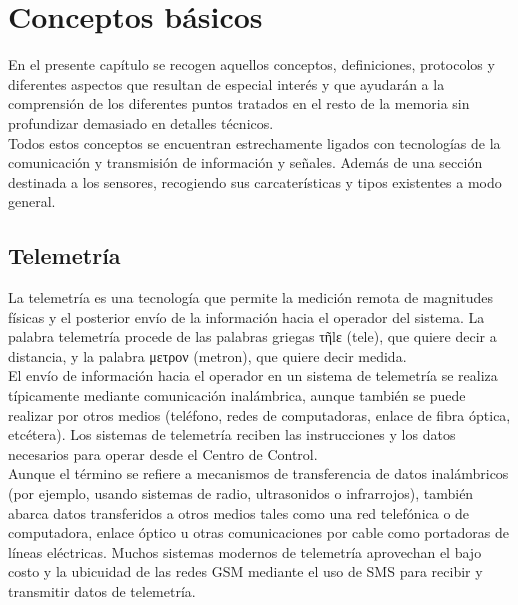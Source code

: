 
\newpage

\chapter{Conceptos básicos}
\label{chap:conceptos-básicos}


En el presente capítulo se recogen aquellos conceptos, definiciones, protocolos y diferentes aspectos que resultan de especial interés y que ayudarán a la comprensión de los diferentes puntos tratados en el resto de 
la memoria sin profundizar demasiado en detalles técnicos.\\

Todos estos conceptos se encuentran estrechamente ligados con tecnologías de la comunicación y transmisión de información y señales. Además de una sección destinada a los sensores, recogiendo sus 
carcaterísticas y tipos existentes a modo general.\\


\section{Telemetría}
\label{def:telemetria}

La telemetría es una tecnología que permite la medición remota de magnitudes físicas y el posterior envío de la información hacia el operador del sistema. La palabra telemetría
procede de las palabras griegas τῆlε (tele), que quiere decir a distancia, y la palabra μετρον (metron), que quiere decir medida.\\

El envío de información hacia el operador en un sistema de telemetría se realiza típicamente mediante comunicación inalámbrica, aunque también se puede realizar por otros medios 
(teléfono, redes de computadoras, enlace de fibra óptica, etcétera). Los sistemas de telemetría reciben las instrucciones y los datos necesarios para operar desde el Centro
de Control.\\

Aunque el término se refiere a mecanismos de transferencia de datos inalámbricos (por ejemplo, usando sistemas de radio, ultrasonidos o infrarrojos), también abarca datos 
transferidos a otros medios tales como una red telefónica o de computadora, enlace óptico u otras comunicaciones por cable como portadoras de líneas eléctricas. Muchos sistemas 
modernos de telemetría aprovechan el bajo costo y la ubicuidad de las redes GSM mediante el uso de SMS para recibir y transmitir datos de telemetría.\\

